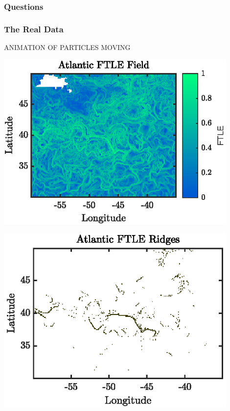 \documentclass[english,svgnames,notes=hide,14pt]{beamer}
\begin{document}
\begin{frame}
\frametitle{Questions}

\vspace{5mm}
\end{frame}



\begin{frame}
\frametitle{The Real Data}

ANIMATION OF PARTICLES MOVING
\end{frame}


\begin{frame}
\centering
	\includegraphics[width=0.9\textwidth]{../figures/atlantic_ftle}

\end{frame}


\begin{frame}
\centering
	\includegraphics[width=0.9\textwidth]{../figures/atlantic_ftle_ridges}
\end{frame}
\end{document}
